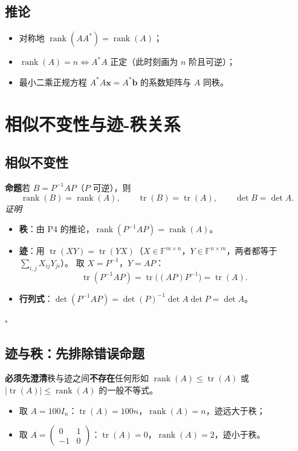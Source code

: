 \documentclass[11pt]{ctexart}
\newcommand{\rank}{\operatorname{rank}}
\newcommand{\tr}{\operatorname{tr}}
\newcommand{\F}{\mathbb{F}}
\begin{document}
\subsection{推论}
\begin{itemize}
\item 对称地 $\rank(AA^{*})=\rank(A)$；
\item $\rank(A)=n\iff A^{*}A$ 正定（此时刻画为 $n$ 阶且可逆）；
\item 最小二乘正规方程 $A^{*}A\mathbf x=A^{*}\mathbf b$ 的系数矩阵与 $A$ 同秩。
\end{itemize}

\section{相似不变性与迹-秩关系}

\subsection{相似不变性}
\textbf{命题}\quad 若 $B=P^{-1}AP$（$P$ 可逆），则
\[
\rank(B)=\rank(A),\qquad\tr(B)=\tr(A),\qquad\det B=\det A .
\]
\emph{证明}
\begin{itemize}
\item \textbf{秩}：由 P4 的推论，$\rank(P^{-1}AP)=\rank(A)$。
\item \textbf{迹}：用 $\tr(XY)=\tr(YX)$（$X\in\F^{m\times n}$，$Y\in\F^{n\times m}$，两者都等于 $\sum_{i,j}X_{ij}Y_{ji}$）。
取 $X=P^{-1}$，$Y=AP$：
\[
\tr(P^{-1}AP)=\tr\bigl((AP)P^{-1}\bigr)=\tr(A).
\]
\item \textbf{行列式}：$\det(P^{-1}AP)=\det(P)^{-1}\det A\det P=\det A$。
\end{itemize}
\hfill$\square$

\subsection{迹与秩：先排除错误命题}
\begin{warnbox}
\textbf{必须先澄清}\quad 秩与迹之间\textbf{不存在}任何形如
$\rank(A)\le\tr(A)$ 或 $\lvert\tr(A)\rvert\le\rank(A)$ 的一般不等式。
\begin{itemize}
\item 取 $A=100I_n$：$\tr(A)=100n$，$\rank(A)=n$，迹远大于秩；
\item 取 $A=\begin{pmatrix}0&1\\-1&0\end{pmatrix}$：$\tr(A)=0$，$\rank(A)=2$，迹小于秩。
\end{itemize}
\end{warnbox}
\end{document}
